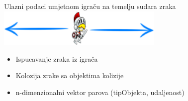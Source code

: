 	\begin{frame}{Ulazni podaci umjetnom igraču na temelju sudara zraka}
		\hspace{5em}\includegraphics[width=0.6\textwidth]{slike/ray}
		\begin{itemize}
			\item Ispucavanje zraka iz igrača
			\item Kolozija zrake  sa objektima kolizije 
			\item n-dimenzionalni vektor parova (tipObjekta, udaljenost)
		\end{itemize}
	\end{frame}
